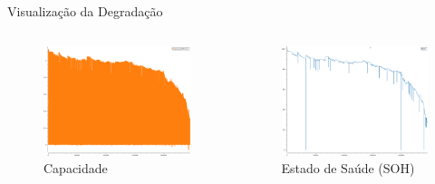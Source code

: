 \documentclass[aspectratio=169,xcolor=dvipsnames]{beamer}
\begin{document}
\begin{frame}{Visualização da Degradação}
  \begin{columns}[T]
    \begin{column}{0.33\textwidth}
      \centering
      \begin{figure}
        \includegraphics[width=\textwidth]{logos/capacity.png}
        \caption{Capacidade}
      \end{figure}
    \end{column}
    \begin{column}{0.33\textwidth}
      \centering
      \begin{figure}
        \includegraphics[width=\textwidth]{logos/SOH.png}
        \caption{Estado de Saúde (SOH)}

\end{figure}
\end{column}
\end{columns}
\end{frame}
\end{document}
